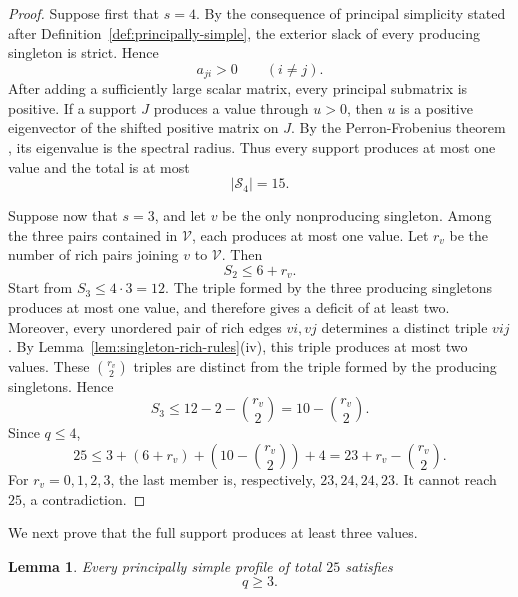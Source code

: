 \documentclass[11pt,a4paper]{article}
\newtheorem{lemma}[theorem]{Lemma}
\theoremstyle{definition}
\newcommand{\Supp}{\mathscr S}
\begin{document}
\begin{proof}
Suppose first that $s=4$. By the consequence of principal simplicity
stated after Definition~\ref{def:principally-simple}, the exterior
slack of every producing singleton is strict. Hence
$$
a_{ji}>0
\qquad
(i\neq j).
$$
After adding a sufficiently large scalar matrix, every principal
submatrix is positive. If a support $J$ produces a value through
$u>0$, then $u$ is a positive eigenvector of the shifted positive
matrix on $J$. By the Perron-Frobenius theorem
\cite[Chapter~8]{HornJohnson2013}, its eigenvalue is the spectral
radius. Thus every support produces at most one value and the total is
at most
$$
|\Supp_4|=15.
$$

Suppose now that $s=3$, and let $v$ be the only nonproducing singleton.
Among the three pairs contained in $\mathcal V$, each produces at most
one value. Let $r_v$ be the number of rich pairs joining $v$ to
$\mathcal V$. Then
$$
S_2\leq6+r_v.
$$
Start from $S_3\leq4\cdot3=12$. The triple formed by the three
producing singletons produces at most one value, and therefore gives a
deficit of at least two. Moreover, every unordered pair of rich edges
$vi,vj$ determines a distinct triple $vij$. By
Lemma~\ref{lem:singleton-rich-rules}\textup{(iv)}, this triple produces
at most two values. These $\binom{r_v}{2}$ triples are distinct from
the triple formed by the producing singletons. Hence
$$
S_3
\leq
12-2-\binom{r_v}{2}
=
10-\binom{r_v}{2}.
$$
Since $q\leq4$,
$$
25
\leq
3+(6+r_v)+\left(10-\binom{r_v}{2}\right)+4
=
23+r_v-\binom{r_v}{2}.
$$
For $r_v=0,1,2,3$, the last member is, respectively,
$23,24,24,23$. It cannot reach $25$, a contradiction.
\end{proof}

We next prove that the full support produces at least three values.

\begin{lemma}
\label{lem:q-not-two}
Every principally simple profile of total $25$ satisfies
$$
q\geq3.
$$
\end{lemma}
\end{document}
